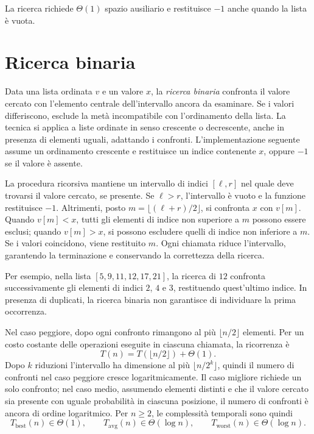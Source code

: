 La ricerca richiede \(\Theta(1)\) spazio ausiliario e restituisce
\(-1\) anche quando la lista è vuota.

\section{Ricerca binaria}
\label{sec:fi-ricerca-binaria}

Data una lista ordinata \(v\) e un valore \(x\), la
\emph{ricerca binaria} confronta il valore cercato con l'elemento
centrale dell'intervallo ancora da esaminare. Se i valori differiscono,
esclude la metà incompatibile con l'ordinamento della lista.
La tecnica si applica a liste ordinate in senso crescente o decrescente,
anche in presenza di elementi uguali, adattando i confronti.
L'implementazione seguente assume un ordinamento crescente
e restituisce un indice contenente \(x\), oppure \(-1\) se il valore
è assente.



La procedura ricorsiva mantiene un intervallo di indici
\([\ell,r]\) nel quale deve trovarsi il valore cercato, se presente.
Se \(\ell>r\), l'intervallo è vuoto e la funzione restituisce
\(-1\). Altrimenti, posto \(m=\lfloor(\ell+r)/2\rfloor\),
si confronta \(x\) con \(v[m]\). Quando \(v[m]<x\), tutti gli elementi
di indice non superiore a \(m\) possono essere esclusi; quando
\(v[m]>x\), si possono escludere quelli di indice non inferiore
a \(m\). Se i valori coincidono, viene restituito \(m\).
Ogni chiamata riduce l'intervallo, garantendo la terminazione
e conservando la correttezza della ricerca.

Per esempio, nella lista \([5,9,11,12,17,21]\), la ricerca di
\(12\) confronta successivamente gli elementi di indici \(2\), \(4\)
e \(3\), restituendo quest'ultimo indice. In presenza di duplicati,
la ricerca binaria non garantisce di individuare la prima occorrenza.

Nel caso peggiore, dopo ogni confronto rimangono al più
\(\lfloor n/2\rfloor\) elementi. Per un costo costante delle
operazioni eseguite in ciascuna chiamata, la ricorrenza è
\[
  T(n)=T(\lfloor n/2\rfloor)+\Theta(1).
\]
Dopo \(k\) riduzioni l'intervallo ha dimensione al più
\(\lfloor n/2^k\rfloor\), quindi il numero di confronti nel caso
peggiore cresce logaritmicamente. Il caso migliore richiede un
solo confronto; nel caso medio, assumendo elementi distinti e
che il valore cercato sia presente con uguale probabilità in
ciascuna posizione, il numero di confronti è ancora di ordine
logaritmico. Per \(n\ge2\), le complessità temporali sono quindi
\[
  T_{\mathrm{best}}(n)\in\Theta(1),\qquad
  T_{\mathrm{avg}}(n)\in\Theta(\log n),\qquad
  T_{\mathrm{worst}}(n)\in\Theta(\log n).
\]

